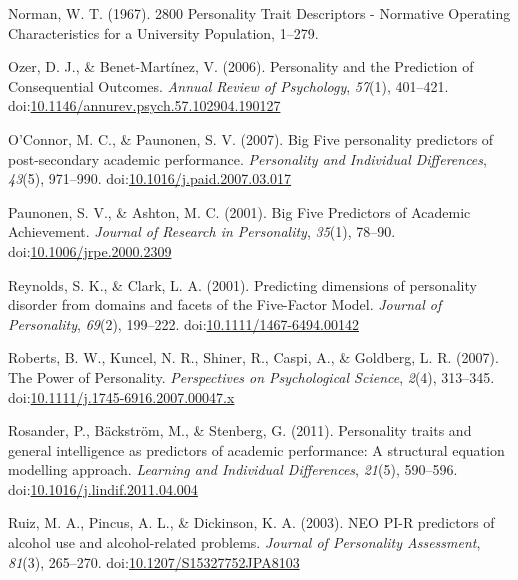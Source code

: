 \documentclass[,man,floatsintext]{apa6}
\begin{document}
\hypertarget{ref-Norman1967}{}
Norman, W. T. (1967). 2800 Personality Trait Descriptors - Normative
Operating Characteristics for a University Population, 1--279.

\hypertarget{ref-OzerBenet2006}{}
Ozer, D. J., \& Benet-Martínez, V. (2006). Personality and the
Prediction of Consequential Outcomes. \emph{Annual Review of
Psychology}, \emph{57}(1), 401--421.
doi:\href{https://doi.org/10.1146/annurev.psych.57.102904.190127}{10.1146/annurev.psych.57.102904.190127}

\hypertarget{ref-OConnor2007}{}
O'Connor, M. C., \& Paunonen, S. V. (2007). Big Five personality
predictors of post-secondary academic performance. \emph{Personality and
Individual Differences}, \emph{43}(5), 971--990.
doi:\href{https://doi.org/10.1016/j.paid.2007.03.017}{10.1016/j.paid.2007.03.017}

\hypertarget{ref-Paunonen2001}{}
Paunonen, S. V., \& Ashton, M. C. (2001). Big Five Predictors of
Academic Achievement. \emph{Journal of Research in Personality},
\emph{35}(1), 78--90.
doi:\href{https://doi.org/10.1006/jrpe.2000.2309}{10.1006/jrpe.2000.2309}

\hypertarget{ref-ClarkReynolds2001}{}
Reynolds, S. K., \& Clark, L. A. (2001). Predicting dimensions of
personality disorder from domains and facets of the Five-Factor Model.
\emph{Journal of Personality}, \emph{69}(2), 199--222.
doi:\href{https://doi.org/10.1111/1467-6494.00142}{10.1111/1467-6494.00142}

\hypertarget{ref-Roberts2007a}{}
Roberts, B. W., Kuncel, N. R., Shiner, R., Caspi, A., \& Goldberg, L. R.
(2007). The Power of Personality. \emph{Perspectives on Psychological
Science}, \emph{2}(4), 313--345.
doi:\href{https://doi.org/10.1111/j.1745-6916.2007.00047.x}{10.1111/j.1745-6916.2007.00047.x}

\hypertarget{ref-Rosander2011}{}
Rosander, P., Bäckström, M., \& Stenberg, G. (2011). Personality traits
and general intelligence as predictors of academic performance: A
structural equation modelling approach. \emph{Learning and Individual
Differences}, \emph{21}(5), 590--596.
doi:\href{https://doi.org/10.1016/j.lindif.2011.04.004}{10.1016/j.lindif.2011.04.004}

\hypertarget{ref-Ruiz2003}{}
Ruiz, M. A., Pincus, A. L., \& Dickinson, K. A. (2003). NEO PI-R
predictors of alcohol use and alcohol-related problems. \emph{Journal of
Personality Assessment}, \emph{81}(3), 265--270.
doi:\href{https://doi.org/10.1207/S15327752JPA8103}{10.1207/S15327752JPA8103}
\end{document}

